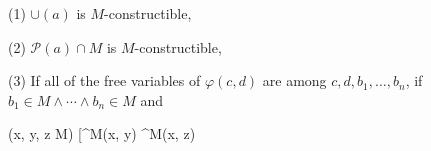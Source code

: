 (1) $\cup(a)$ is $M$-constructible,

(2) $\mathcal{P}(a) \cap M$ is $M$-constructible,

(3) If all of the free variables of $\varphi(c, d)$ are among $c, d, b_1, \ldots, b_n$, if $b_1 \in M \land \cdots \land b_n \in M$ and

$$(\forall x, y, z \in M) [\varphi^M(x, y) \land \varphi^M(x, z)
